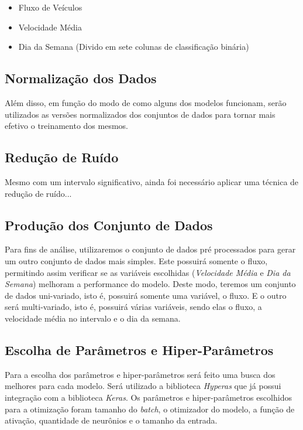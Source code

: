\begin{itemize}
    \item Fluxo de Veículos
    \item Velocidade Média
    \item Dia da Semana (Divido em sete colunas de classificação binária)
\end{itemize}

\subsection{Normalização dos Dados}

Além disso, em função do modo de como alguns dos modelos funcionam, serão utilizados as versões normalizados dos conjuntos de dados para tornar mais efetivo o treinamento dos mesmos.

\subsection{Redução de Ruído}

Mesmo com um intervalo significativo, ainda foi necessário aplicar uma técnica de redução de ruído...

\subsection{Produção dos Conjunto de Dados}

Para fins de análise, utilizaremos o conjunto de dados pré processados para gerar um outro conjunto de dados mais simples. Este possuirá somente o fluxo, permitindo assim verificar se as variáveis escolhidas (\textit{Velocidade Média} e \textit{Dia da Semana}) melhoram a performance do modelo. Deste modo, teremos um conjunto de dados uni-variado, isto é, possuirá somente uma variável, o fluxo. E o outro será multi-variado, isto é, possuirá várias variáveis, sendo elas o fluxo, a velocidade média no intervalo e o dia da semana.

\subsection{Escolha de Parâmetros e Hiper-Parâmetros}

Para a escolha dos parâmetros e hiper-parâmetros será feito uma busca dos melhores para cada modelo. Será utilizado a biblioteca \textit{Hyperas} que já possui integração com a biblioteca \textit{Keras}. Os parâmetros e hiper-parâmetros escolhidos para a otimização foram tamanho do \textit{batch}, o otimizador do modelo, a função de ativação, quantidade de neurônios e o tamanho da entrada. 

